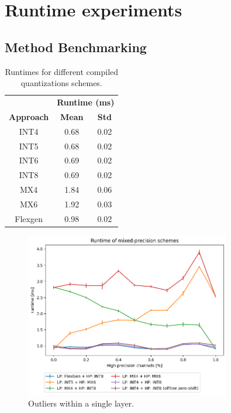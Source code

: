 \section{Runtime experiments}
\subsection{Method Benchmarking}

\begin{table}[ht]
\centering
\begin{tabular}{ccc}
\toprule
& \multicolumn{2}{c}{\textbf{Runtime (ms)}} \\
\textbf{Approach} & \textbf{Mean} & \textbf{Std} \\ \hline
INT4   & 0.68 & 0.02  \\
INT5   & 0.68 & 0.02 \\
INT6   & 0.69 & 0.02 \\
INT8   & 0.69 & 0.02 \\ \hline
MX4    & 1.84 & 0.06 \\
MX6    & 1.92 & 0.03 \\ \hline
Flexgen & 0.98 & 0.02 \\
\bottomrule
\end{tabular}
\caption{Runtimes for different compiled quantizations schemes.}
\label{tab:runtime_sp} 
\end{table}

\begin{figure}
\centering
\includegraphics[width=0.8\textwidth]{figures/runtime_mp}
\caption{Outliers within a single layer.}
\label{fig:runtime_mp}
\end{figure}

